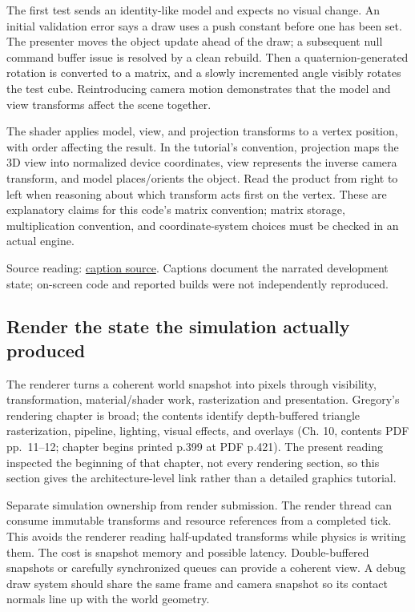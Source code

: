 The first test sends an identity-like model and expects no visual change. An initial validation error says a draw uses a push constant before one has been set. The presenter moves the object update ahead of the draw; a subsequent null command buffer issue is resolved by a clean rebuild. Then a quaternion-generated rotation is converted to a matrix, and a slowly incremented angle visibly rotates the test cube. Reintroducing camera motion demonstrates that the model and view transforms affect the scene together.

The shader applies model, view, and projection transforms to a vertex position, with order affecting the result. In the tutorial's convention, projection maps the 3D view into normalized device coordinates, view represents the inverse camera transform, and model places/orients the object. Read the product from right to left when reasoning about which transform acts first on the vertex. These are explanatory claims for this code's matrix convention; matrix storage, multiplication convention, and coordinate-system choices must be checked in an actual engine.

Source reading: \href{https://www.youtube.com/watch?v=xGonaV-OB7E}{caption source}. Captions document the narrated development state; on-screen code and reported builds were not independently reproduced.

\subsection{Render the state the simulation actually produced}\label{06-engine-ii-ch026-render-the-state-the-simulation-actually-produced}

\hypertarget{06-engine-ii-ch026-render-the-state-the-simulation-actually-produced}{}

The renderer turns a coherent world snapshot into pixels through visibility, transformation, material/shader work, rasterization and presentation. Gregory's rendering chapter is broad; the contents identify depth-buffered triangle rasterization, pipeline, lighting, visual effects, and overlays (Ch. 10, contents PDF pp.~11--12; chapter begins printed p.399 at PDF p.421). The present reading inspected the beginning of that chapter, not every rendering section, so this section gives the architecture-level link rather than a detailed graphics tutorial.

Separate simulation ownership from render submission. The render thread can consume immutable transforms and resource references from a completed tick. This avoids the renderer reading half-updated transforms while physics is writing them. The cost is snapshot memory and possible latency. Double-buffered snapshots or carefully synchronized queues can provide a coherent view. A debug draw system should share the same frame and camera snapshot so its contact normals line up with the world geometry.

